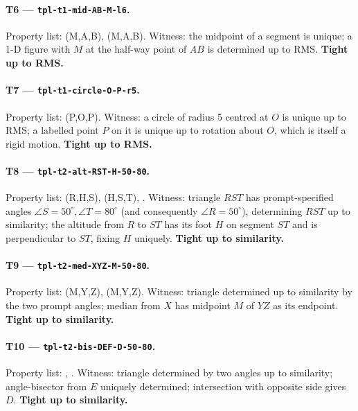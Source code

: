 \paragraph{T6 --- \texttt{tpl-t1-mid-AB-M-l6}.}
Property list: (M,A,B), (M,A,B).
Witness: the midpoint of a segment is unique; a 1-D figure with $M$ at the half-way point of $AB$ is determined up to RMS.
\textbf{Tight up to RMS.}

\paragraph{T7 --- \texttt{tpl-t1-circle-O-P-r5}.}
Property list: (P,O,P).
Witness: a circle of radius 5 centred at $O$ is unique up to RMS; a labelled point $P$ on it is unique up to rotation about $O$, which is itself a rigid motion.
\textbf{Tight up to RMS.}

\paragraph{T8 --- \texttt{tpl-t2-alt-RST-H-50-80}.}
Property list: (R,H,S), (H,S,T), .
Witness: triangle $RST$ has prompt-specified angles $\angle S{=}50^\circ, \angle T{=}80^\circ$ (and consequently $\angle R{=}50^\circ$), determining $RST$ up to similarity; the altitude from $R$ to $ST$ has its foot $H$ on segment $ST$ and is perpendicular to $ST$, fixing $H$ uniquely.
\textbf{Tight up to similarity.}

\paragraph{T9 --- \texttt{tpl-t2-med-XYZ-M-50-80}.}
Property list: (M,Y,Z), (M,Y,Z).
Witness: triangle determined up to similarity by the two prompt angles; median from $X$ has midpoint $M$ of $YZ$ as its endpoint.
\textbf{Tight up to similarity.}

\paragraph{T10 --- \texttt{tpl-t2-bis-DEF-D-50-80}.}
Property list: , .
Witness: triangle determined by two angles up to similarity; angle-bisector from $E$ uniquely determined; intersection with opposite side gives $D$.
\textbf{Tight up to similarity.}

